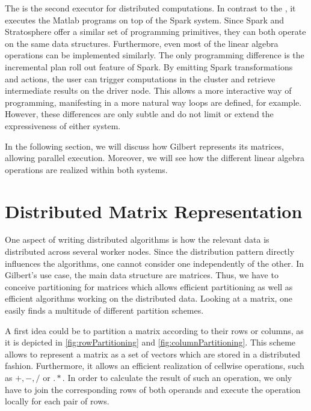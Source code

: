 The  is the second executor for distributed computations.
In contrast to the , it executes the Matlab programs on top of the Spark system.
Since Spark and Stratosphere offer a similar set of programming primitives, they can both operate on the same data structures.
Furthermore, even most of the linear algebra operations can be implemented similarly.
The only programming difference is the incremental plan roll out feature of Spark.
By emitting Spark transformations and actions, the user can trigger computations in the cluster and retrieve intermediate results on the driver node.
This allows a more interactive way of programming, manifesting in a more natural way loops are defined, for example.
However, these differences are only subtle and do not limit or extend the expressiveness of either system.

In the following section, we will discuss how Gilbert represents its matrices, allowing parallel execution.
Moreover, we will see how the different linear algebra operations are realized within both systems.

\section{Distributed Matrix Representation}
\label{sec:DistributedMatrixRepresentation}

One aspect of writing distributed algorithms is how the relevant data is distributed across several worker nodes.
Since the distribution pattern directly influences the algorithms, one cannot consider one independently of the other.
In Gilbert's use case, the main data structure are matrices.
Thus, we have to conceive partitioning for matrices which allows efficient partitioning as well as efficient algorithms working on the distributed data.
Looking at a matrix, one easily finds a multitude of different partition schemes.

A first idea could be to partition a matrix according to their rows or columns, as it is depicted in \cref{fig:rowPartitioning} and \cref{fig:columnPartitioning}.
This scheme allows to represent a matrix as a set of vectors which are stored in a distributed fashion.
Furthermore, it allows an efficient realization of cellwise operations, such as $+,-,/$ or $.*$.
In order to calculate the result of such an operation, we only have to join the corresponding rows of both operands and execute the operation locally for each pair of rows.

